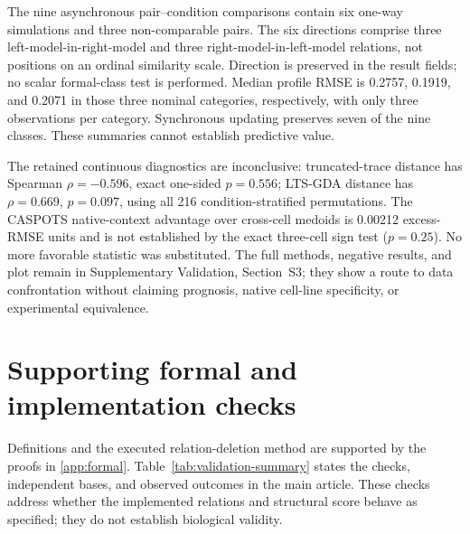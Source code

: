 \documentclass{ws-jbcb}
\numberwithin{equation}{section}
\begin{document}
The nine asynchronous pair--condition comparisons contain six one-way
simulations and three non-comparable pairs. The six directions comprise three
left-model-in-right-model and three right-model-in-left-model relations, not
positions on an ordinal similarity scale. Direction is preserved in the result
fields; no scalar formal-class test is performed. Median profile RMSE is
0.2757, 0.1919, and 0.2071 in those three nominal categories, respectively,
with only three observations per category. Synchronous updating preserves
seven of the nine classes. These summaries cannot establish predictive value.

The retained continuous diagnostics are inconclusive: truncated-trace distance
has Spearman $\rho=-0.596$, exact one-sided $p=0.556$; LTS-GDA distance has
$\rho=0.669$, $p=0.097$, using all 216 condition-stratified permutations.
The CASPOTS native-context advantage over cross-cell medoids is 0.00212
excess-RMSE units and is not established by the exact three-cell sign test
($p=0.25$). No more favorable statistic was substituted. The full methods,
negative results, and plot remain in Supplementary Validation, Section~S3;
they show a route to data confrontation without claiming prognosis, native
cell-line specificity, or experimental equivalence.

\section{Supporting formal and implementation checks}
\label{sec:computational-validation}

Definitions and the executed relation-deletion method are supported by the
proofs in \ref{app:formal}. Table~\ref{tab:validation-summary} states
the checks, independent bases, and observed outcomes in the main article.
These checks address whether the implemented relations and structural score
behave as specified; they do not establish biological validity.
\end{document}
